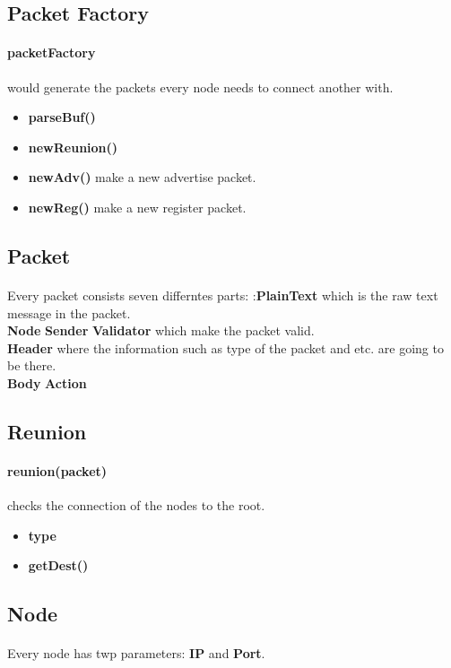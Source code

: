 \documentclass{article}
\begin{document}
\subsection{Packet Factory}
\paragraph{packetFactory} would generate the packets every node needs to connect another with.
\begin{itemize}
    \item \textbf{parseBuf()}
    \item \textbf{newReunion()}
    \item \textbf{newAdv()} make a new advertise packet.
    \item \textbf{newReg()} make a new register packet.
\end{itemize}
\subsection{Packet}
\paragraph{}Every packet consists seven differntes parts: :\textbf{PlainText} which is the raw text message in the packet.\\
 \textbf{Node} \textbf{Sender} \textbf{Validator} which make the packet valid.\\ \textbf{Header} where the information such as type of the packet and etc. are going to be there.\\ \textbf{Body}  \textbf{Action}
\subsection{Reunion}
\paragraph{reunion(packet)} checks the connection of the nodes to the root.
\begin{itemize}
    \item \textbf{type}
    \item \textbf{getDest()}
\end{itemize}
\subsection{Node}
\paragraph{}Every node has twp parameters: \textbf{IP} and \textbf{Port}.
\end{document}
